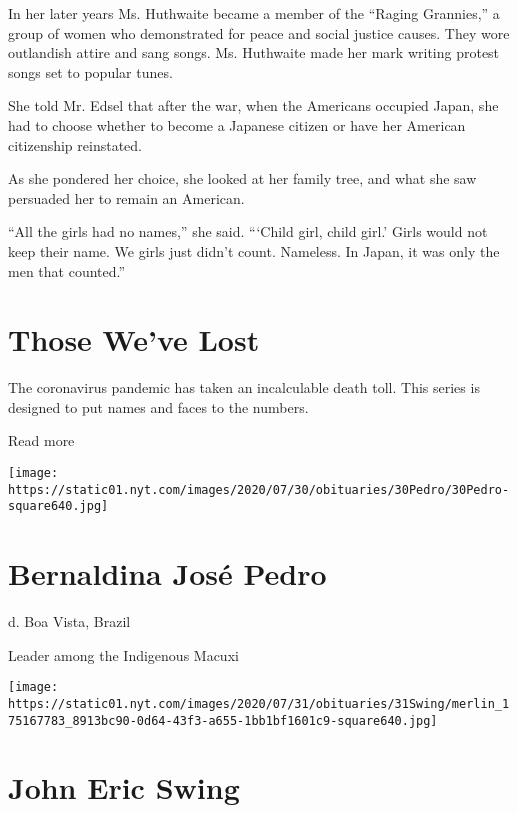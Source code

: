In her later years Ms. Huthwaite became a member of the ``Raging
Grannies,'' a group of women who demonstrated for peace and social
justice causes. They wore outlandish attire and sang songs. Ms.
Huthwaite made her mark writing protest songs set to popular tunes.

She told Mr. Edsel that after the war, when the Americans occupied
Japan, she had to choose whether to become a Japanese citizen or have
her American citizenship reinstated.

As she pondered her choice, she looked at her family tree, and what she
saw persuaded her to remain an American.

``All the girls had no names,'' she said. ```Child girl, child girl.'
Girls would not keep their name. We girls just didn't count. Nameless.
In Japan, it was only the men that counted.''

\href{https://www.nytimes.com/interactive/2020/obituaries/people-died-coronavirus-obituaries.html?action=click\&pgtype=Article\&state=default\&region=BELOW_MAIN_CONTENT\&context=covid_obits_promo}{}

\hypertarget{those-weve-lost}{%
\section{Those We've Lost}\label{those-weve-lost}}

The coronavirus pandemic has taken an incalculable death toll. This
series is designed to put names and faces to the numbers.

Read more

\texttt{[image: https://static01.nyt.com/images/2020/07/30/obituaries/30Pedro/30Pedro-square640.jpg]}

\hypertarget{bernaldina-josuxe9-pedro}{%
\section{Bernaldina José Pedro}\label{bernaldina-josuxe9-pedro}}

d. Boa Vista, Brazil

Leader among the Indigenous Macuxi

\texttt{[image: https://static01.nyt.com/images/2020/07/31/obituaries/31Swing/merlin\_175167783\_8913bc90-0d64-43f3-a655-1bb1bf1601c9-square640.jpg]}

\hypertarget{john-eric-swing}{%
\section{John Eric Swing}\label{john-eric-swing}}


